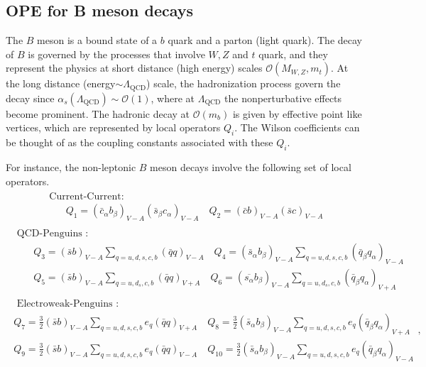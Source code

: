 \subsection{OPE for B meson decays}\label{section:OPE_b}
The $B$ meson is a bound state of a $b$ quark and a parton (light quark). The decay of $B$ is governed by the processes that involve $W, Z$ and $t$ quark, and they represent the physics at short distance (high energy) scales $\mathcal{O}(M_{W,Z}, m_t)$. At the long distance (energy$\sim \Lambda_{\text{QCD}}$) scale, the hadronization process govern the decay since $\alpha_s(\Lambda_{\text{QCD}})\sim \mathcal{O}(1)$, where at $\Lambda_{\text{QCD}}$ the nonperturbative effects become prominent. The hadronic decay at $\mathcal{O}(m_b)$ is given by effective point like vertices, which are represented by local operators $Q_i$. The Wilson coefficients can be thought of as the coupling constants associated with these $Q_i$.\par 
For instance, the non-leptonic $B$ meson decays involve the following set of local operators.
\begin{eqnarray}
\begin{array}{l}{\text { Current-Current: }} \\ {\qquad Q_{1}=\left(\bar{c}_{\alpha} b_{\beta}\right)_{V-A}\left(\bar{s}_{\beta} c_{\alpha}\right)_{V-A} \quad Q_{2}=(\bar{c} b)_{V-A}(\bar{s} c)_{V-A}}\end{array}
\end{eqnarray}
\begin{eqnarray}
\begin{array}{l}{\text { QCD-Penguins : }} \\ {\qquad Q_{3}=(\bar{s} b)_{V-A} \sum_{q=u, d, s, c, b}(\bar{q} q)_{V-A} \quad Q_{4}=\left(\bar{s}_{\alpha} b_{\beta}\right)_{V-A} \sum_{q=u, d, s, c, b}\left(\bar{q}_{\beta} q_{\alpha}\right)_{V-A}}\\{\qquad Q_{5}=(\bar{s} b)_{V-A} \sum_{q=u, d_{s}, c, b}(\bar{q} q)_{V+A} \quad Q_{6}=\left(\overline{s_{\alpha}} b_{\beta}\right)_{V-A} \sum_{ q=u, d_{s}, c, b}\left(\bar{q}_{\beta} q_{\alpha}\right)_{V+A}}\end{array}
\end{eqnarray}
\begin{eqnarray}
\begin{array}{l}{\text { Electroweak-Penguins : }} \\ {Q_{7}=\frac{3}{2}(\bar{s} b)_{V-A} \sum_{q=u, d, s, c, b} e_{q}(\bar{q} q)_{V+A} \quad Q_{8}=\frac{3}{2}\left(\bar{s}_{\alpha} b_{\beta}\right)_{V-A} \sum_{q=u, d, s, c, b} e_{q}\left(\bar{q}_{\beta} q_{\alpha}\right)_{V+A}} \\ {Q_{9}=\frac{3}{2}(\bar{s} b)_{V-A} \sum_{q=u, d, s, c, b} e_{q}(\bar{q} q)_{V-A} \quad Q_{10}=\frac{3}{2}\left(\bar{s}_{\alpha} b_{\beta}\right)_{V-A} \sum_{q=u, d, s, c, b} e_{q}\left(\bar{q}_{\beta} q_{\alpha}\right)_{V-A}}\end{array},
\end{eqnarray}
